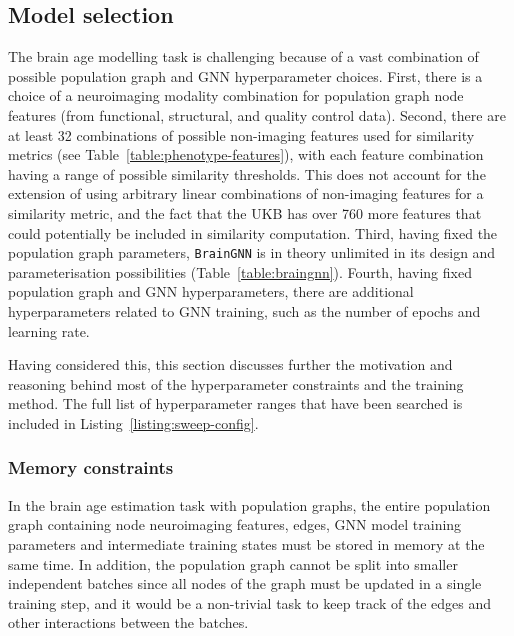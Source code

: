 \subsection{Model selection}

The brain age modelling task is challenging because of a vast combination of possible population graph and GNN hyperparameter choices. First, there is a choice of a neuroimaging modality combination for population graph node features (from functional, structural, and quality control data). Second, there are at least 32 combinations of possible non-imaging features used for similarity metrics (see Table~\ref{table:phenotype-features}), with each feature combination having a range of possible similarity thresholds. This does not account for the extension of using arbitrary linear combinations of non-imaging features for a similarity metric, and the fact that the UKB has over 760 more features that could potentially be included in similarity computation. Third, having fixed the population graph parameters, \texttt{BrainGNN} is in theory unlimited in its design and parameterisation possibilities (Table~\ref{table:braingnn}). Fourth, having fixed population graph and GNN hyperparameters, there are additional hyperparameters related to GNN training, such as the number of epochs and learning rate.

Having considered this, this section discusses further the motivation and reasoning behind most of the hyperparameter constraints and the training method. The full list of hyperparameter ranges that have been searched is included in Listing~\ref{listing:sweep-config}. 

\subsubsection{Memory constraints}
\label{section:memory}

In the brain age estimation task with population graphs, the entire population graph containing node neuroimaging features, edges, GNN model training parameters and intermediate training states must be stored in memory at the same time. In addition, the population graph cannot be split into smaller independent batches since all nodes of the graph must be updated in a single training step, and it would be a non-trivial task to keep track of the edges and other interactions between the batches.

